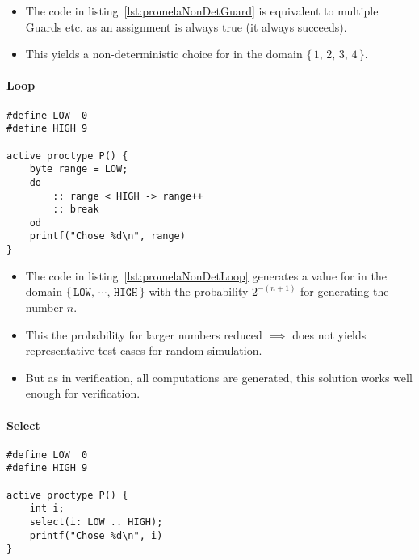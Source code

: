 				\begin{itemize}
					\item The code in listing~\ref{lst:promelaNonDetGuard} is equivalent to multiple Guards  etc. as an assignment is always true (it always succeeds).
					\item This yields a non-deterministic choice for  in the domain \( \{\, 1,\, 2,\, 3,\, 4 \,\} \).
				\end{itemize}
			
			\paragraph{Loop}
				\begin{lstlisting}[caption = { PROMELA Non-Deterministic Value Generation by Loop }, label = lst:promelaNonDetLoop, language = PROMELA]
#define LOW  0
#define HIGH 9

active proctype P() {
	byte range = LOW;
	do
		:: range < HIGH -> range++
		:: break
	od
	printf("Chose %d\n", range)
}
				\end{lstlisting}
				
				\begin{itemize}
					\item The code in listing~\ref{lst:promelaNonDetLoop} generates a value for  in the domain \( \{\, \texttt{LOW},\, \cdots,\, \texttt{HIGH} \,\} \) with the probability \( 2^{-(n + 1)} \) for generating the number \(n\).
					\item This the probability for larger numbers reduced \( \implies \) does not yields representative test cases for random simulation.
					\item But as in verification, all computations are generated, this solution works well enough for verification.
				\end{itemize}
			
			\paragraph{Select}
				\begin{lstlisting}[caption = { PROMELA Non-Deterministic Value Generation by Select }, label = lst:promelaNonDetSelect, language = PROMELA]
#define LOW  0
#define HIGH 9

active proctype P() {
	int i;
	select(i: LOW .. HIGH);
	printf("Chose %d\n", i)
}
				\end{lstlisting}
				
